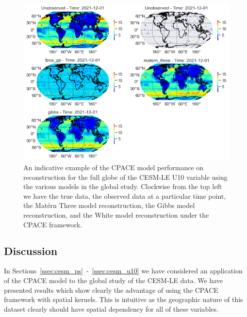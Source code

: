 \begin{figure}
\centering
\includegraphics[width=\textwidth]{full_ex_u10_globe}
\caption[An indicative example of the CPACE model performance on reconstruction for the full globe of the CESM-LE U10 variable using the various models in the global study.]{An indicative example of the CPACE model performance on reconstruction for the full globe of the CESM-LE U10 variable using the various models in the global study. Clockwise from the top left we have the true data, the observed data at a particular time point, the Mat\'ern Three model reconstruction, the Gibbs model reconstruction, and the White model reconstruction under the CPACE framework.}
\label{fig:full_ex_u10_globe}
\end{figure}

\subsection{Discussion \label{ssec:globe_discussion}}
In Sections~\ref{ssec:cesm_ps}~-~\ref{ssec:cesm_u10} we have considered an application of the CPACE model to the global study of the CESM-LE data. 
We have presented results which show clearly the advantage of using the CPACE framework with spatial kernels.
This is intuitive as the geographic nature of this dataset clearly should have spatial dependency for all of these variables.

